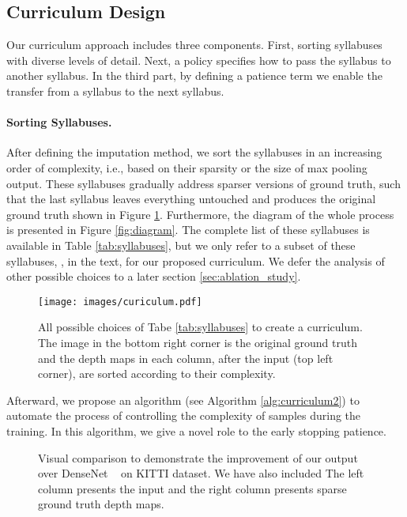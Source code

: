 \documentclass{article}
\begin{document}
\subsection{Curriculum Design} 
Our curriculum approach includes three components. First, sorting syllabuses with diverse levels of detail. Next, a policy specifies how to pass the syllabus to another syllabus. In the third part, by defining a patience term we enable the transfer from a syllabus to the next syllabus.

\paragraph{Sorting Syllabuses.} After defining the imputation method, we sort the syllabuses  in an increasing order of complexity, i.e., based on their sparsity or the size of max pooling output. These syllabuses gradually address sparser versions of ground truth, such that the last syllabus leaves everything untouched and produces the original ground truth shown in Figure \ref{fig:curriculum}. Furthermore, the diagram of the whole process is presented in Figure \ref{fig:diagram}. The complete list of these syllabuses is available in Table \ref{tab:syllabuses}, but we only refer to a subset of these syllabuses, , in the text, for our proposed curriculum. We defer the analysis of other possible choices to a later section \ref{sec:ablation_study}.

\begin{figure}[H]
    \centering
    \texttt{[image: images/curiculum.pdf]}
    \caption{All possible choices of Tabe \ref{tab:syllabuses} to create a curriculum. The image in the bottom right corner is the original ground truth and the depth maps in each column, after the input (top left corner), are sorted according to their complexity.}
    \label{fig:curriculum}
\end{figure}

Afterward, we propose an algorithm (see Algorithm \ref{alg:curriculum2}) to automate the process of controlling the complexity of samples during the training. In this algorithm, we give a novel role to the early stopping patience.


\begin{figure}[H]    
    \centering
    \caption{Visual comparison to demonstrate the improvement of our output over DenseNet ~\cite{alhashim2018high} on KITTI dataset. We have also included The left column presents the input and the right column presents sparse ground truth depth maps.}
    \label{fig:comparison}
\end{figure}
\end{document}
